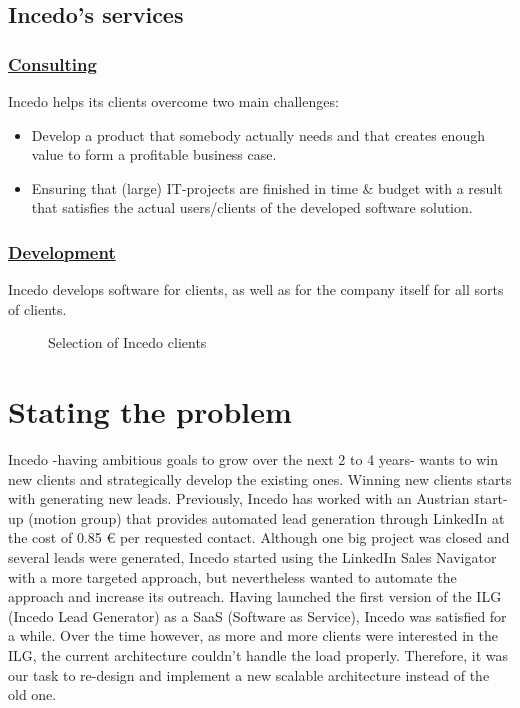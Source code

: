 \subsection{Incedo's services}
\subsubsection*{\underline{Consulting}}
Incedo helps its clients overcome two main challenges:
\begin{itemize}
    \item Develop a product that somebody actually needs and that creates enough value to form a profitable business case.
    \item Ensuring that (large) IT-projects are finished in time \& budget with a result that satisfies the actual users/clients of the developed software solution.
\end{itemize}

\subsubsection*{\underline{Development}}
Incedo develops software for clients, as well as for the company itself for all sorts of clients.
\begin{figure}[H]
    \centering
    \caption{Selection of Incedo clients}
    \label{fig:selection-of-incedo-clients}
\end{figure}

\section{Stating the problem}
Incedo -having ambitious goals to grow over the next 2 to 4 years- wants to win new clients and strategically develop the existing ones. Winning new clients starts with generating new leads. Previously, Incedo has worked with an Austrian start-up (motion group) that provides automated lead generation through LinkedIn at the cost of 0.85 € per requested contact. Although one big project was closed and several leads were generated, Incedo started using the LinkedIn Sales Navigator with a more targeted approach, but nevertheless wanted to automate the approach and increase its outreach.
Having launched the first version of the ILG (Incedo Lead Generator) as a SaaS (Software as Service), Incedo was satisfied for a while. Over the time however, as more and more clients were interested in the ILG, the current architecture couldn’t handle the load properly. Therefore, it was our task to re-design and implement a new scalable architecture instead of the old one.

